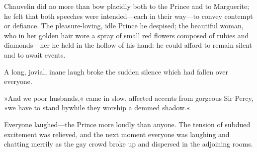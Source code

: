 Chauvelin did no more than bow placidly both to the Prince and to Marguerite; he felt that both speeches were intended—each in their way—to convey contempt or defiance. The pleasure-loving, idle Prince he despised; the beautiful woman, who in her golden hair wore a spray of small red flowers composed of rubies and diamonds—her he held in the hollow of his hand: he could afford to remain silent and to await events.

A long, jovial, inane laugh broke the sudden silence which had fallen over everyone.

»And we poor husbands,« came in slow, affected accents from gorgeous Sir Percy, »we have to stand by\textellipsis \allowbreak  while they worship a demmed shadow.«

Everyone laughed—the Prince more loudly than anyone. The tension of subdued excitement was relieved, and the next moment everyone was laughing and chatting merrily as the gay crowd broke up and dispersed in the adjoining rooms.